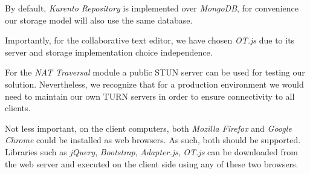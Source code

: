 \documentclass[10pt,conference]{IEEEtran}
\begin{document}
By default, \emph{Kurento Repository} is implemented over \emph{MongoDB}, for convenience our storage model will also use the same database.

Importantly, for the collaborative text editor, we have chosen \emph{OT.js} due to its server and storage implementation choice independence.

For the \emph{NAT Traversal} module a public \gls{STUN} server can be used for testing our solution. Nevertheless, we recognize that for a production environment we would need to maintain our own \gls{TURN} servers in order to ensure connectivity to all clients.

Not less important, on the client computers, both \emph{Mozilla Firefox} and \emph{Google Chrome} could be installed as web browsers. As such, both should be supported. Libraries such as \emph{jQuery}, \emph{Bootstrap}, \emph{Adapter.js}, \emph{OT.js} can be downloaded from the web server and executed on the client side using any of these two browsers.

\begin{table}[H]
\centering
	\caption{Application Architecture}
	\label{table:apparch}

\end{table}

\end{document}
